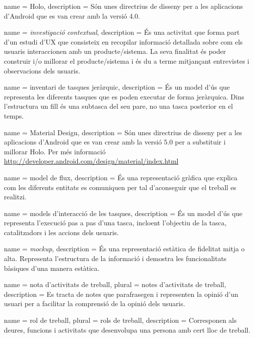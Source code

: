 {
name = Holo, description = {Són unes directrius de disseny per a les aplicacions d'\gls{Android} que es van crear amb la versió 4.0.}
}

{
name = \textit{investigació contextual}, description = {És una activitat que forma part d'un estudi d'UX que consisteix en recopilar informació detallada sobre com els usuaris interaccionen amb un producte/sistema. La seva finalitat és poder construir i/o millorar el producte/sistema i és du a terme mitjançant entrevistes i observacions dels usuaris.}
}

{
name = inventari de tasques jeràrquic, description = {És un model d'ús que representa les diferents tasques que es poden executar de forma jeràrquica. Dins l'estructura un fill és una subtasca del seu pare, no una tasca posterior en el temps.}
}

{
name = Material Design, description = {Són unes directrius de disseny per a les aplicacions d'Android que es van crear amb la versió 5.0 per a substituir i millorar Holo. Per més informació \url{http://developer.android.com/design/material/index.html}}
}

{
name = model de flux, description = {És una representació gràfica que explica com les diferents entitats es comuniquen per tal d'aconseguir que el treball es realitzi.}
}

{
name = models d'interacció de les tasques, description = {És un model d'ús que representa l'execució pas a pas d'una tasca, incloent l'objectiu de la tasca, catalitzadors i les accions dels usuaris.}
}

{
name = \textit{mockup}, description = {És una representació estàtica de fidelitat mitja o alta.  Representa l'estructura de la informació i demostra les funcionalitats bàsiques d'una manera estàtica.}
}

{
name = nota d'activitats de treball, plural = notes d'activitats de treball, description = {Es tracta de notes que parafrasegen i representen la opinió d'un usuari per a facilitar la comprensió de la opinió dels usuaris.}  
}

{
name = rol de treball, plural = rols de treball, description = {Corresponen als deures, funcions i activitats que desenvolupa una persona amb cert lloc de treball.}  
}

